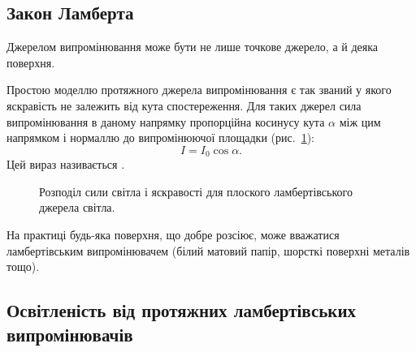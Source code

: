 \subsection*{Закон Ламберта}


Джерелом випромінювання може бути не лише точкове джерело, а й деяка поверхня.


Простою моделлю протяжного джерела випромінювання є так званий   у якого яскравість не залежить від кута спостереження. Для таких джерел сила випромінювання в даному напрямку пропорційна
косинусу кута $\alpha$ між цим напрямком і нормаллю до випромінюючої
площадки (рис.~\ref{pic:Lambert_Law}):
\begin{equation}\label{eq:Lambert_Law}
	I = I_0\cos\alpha.
\end{equation}
Цей вираз називається .

\begin{figure}[h!]\centering%
    \centering
    
    \caption{Розподіл сили світла і яскравості для плоского ламбертівського джерела світла.}
    \label{pic:Lambert_Law}
\end{figure}

На практиці будь-яка поверхня, що добре розсіює, може вважатися ламбертівським випромінювачем (білий матовий папір, шорсткі поверхні металів тощо).


\subsection*{Освітленість від протяжних ламбертівських випромінювачів}


